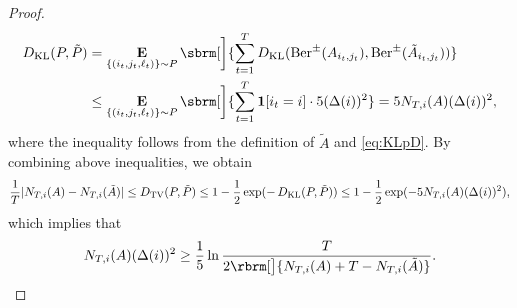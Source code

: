 \begin{proof}
\begin{align*}
        \KL ( P, \tilde{P} )
        &
        =
        \E_{\{(i_t, j_t, \ell_t)\} \sim P} 
        \sbrm[\bigg]{
        \sum_{t=1}^T 
        \KL ( \Berpm( A_{i_t, j_t} ), \Berpm( \tilde{A}_{i_t, j_t} ) ) 
        }
        \\
        &
        \le
        \E_{\{(i_t, j_t, \ell_t)\} \sim P} 
        \sbrm[\bigg]{ 
        \sum_{t=1}^T 
        \mathbf{1}[i_t = i]
        \cdot
        5 (\Deltar(i))^2
        }
        =
        5 \Tr_{T, i} (A) (\Deltar(i))^2 ,
    \end{align*}
    where the inequality follows from the definition of $\tilde{A}$ and \eqref{eq:KLpD}.
    By combining above inequalities,
    we obtain
    \begin{align*}
        \frac{1}{T}|N_{T, i}(A) - N_{T, i}(\tilde{A})|
        \le
        \mathop{D_{\mathrm{TV}}}\limits ( P, \tilde{P} )
        \le
        1 - \frac{1}{2} \exp ( -\mathop{D_{\mathrm{KL}}}\limits (P, \tilde{P}) )
        \le
        1 - \frac{1}{2} \exp ( -
        5 N_{T, i} (A) (\Delta(i))^2 
        ),
    \end{align*}
    which implies that
    \begin{align*}
        \Tr_{T, i} (A) (\Deltar(i))^2 
        \ge
        \frac{1}{5}
        \ln 
        {
        \frac{T}{2 \rbrm[\big]{
        \Tr_{T, i}(A) +  T - \Tr_{T, i}(\tilde{A})
        }}
        }.
    \end{align*}
\end{proof}

